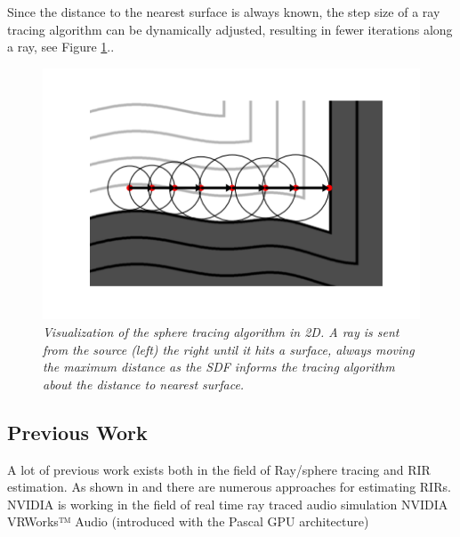 \documentclass[twoside,a4paper]{article}
\begin{document}
Since the distance to the nearest surface is always known, the step size of a ray tracing algorithm can be dynamically adjusted, resulting in fewer iterations along a ray, see Figure \ref{sphereViz}..



\begin{figure}[ht]
\centerline{\includegraphics[scale=0.5]{img/sphereTracingViz.png}}
\caption{\label{sphereViz}{\it Visualization of the sphere tracing algorithm in 2D. A ray is sent from the source (left) the right until it hits a surface, always moving the maximum distance as the SDF informs the tracing algorithm about the distance to nearest surface.}}
\end{figure}
%

%         






\subsection{Previous Work}
\label{ssec:prev}
A lot of previous work exists both in the field of Ray/sphere tracing and RIR estimation.
As shown in \cite{alpkocak_computing_2010} and \cite{brinkmann_round_2019} there are numerous approaches for estimating RIRs. 
NVIDIA is working in the field of real time ray traced audio simulation
NVIDIA VRWorks™ Audio (introduced with the Pascal GPU architecture) 
\end{document}
